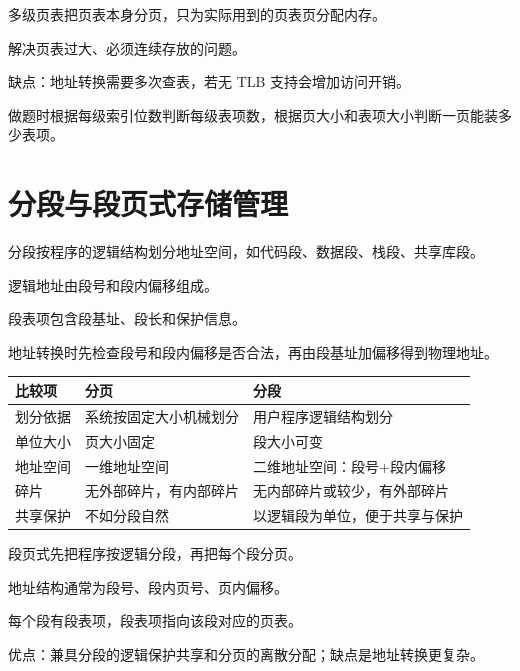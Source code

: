 \begin{points}
  \item 多级页表把页表本身分页，只为实际用到的页表页分配内存。
  \item 解决页表过大、必须连续存放的问题。
  \item 缺点：地址转换需要多次查表，若无 TLB 支持会增加访问开销。
  \item 做题时根据每级索引位数判断每级表项数，根据页大小和表项大小判断一页能装多少表项。
\end{points}


\section{分段与段页式存储管理}
\begin{points}
  \item 分段按程序的逻辑结构划分地址空间，如代码段、数据段、栈段、共享库段。
  \item 逻辑地址由段号和段内偏移组成。
  \item 段表项包含段基址、段长和保护信息。
  \item 地址转换时先检查段号和段内偏移是否合法，再由段基址加偏移得到物理地址。
\end{points}


\begin{longtable}{p{}p{}p{}}
\toprule
比较项 & 分页 & 分段 \\
\midrule
划分依据 & 系统按固定大小机械划分 & 用户程序逻辑结构划分 \\
单位大小 & 页大小固定 & 段大小可变 \\
地址空间 & 一维地址空间 & 二维地址空间：段号+段内偏移 \\
碎片 & 无外部碎片，有内部碎片 & 无内部碎片或较少，有外部碎片 \\
共享保护 & 不如分段自然 & 以逻辑段为单位，便于共享与保护 \\
\bottomrule
\end{longtable}

\begin{points}
  \item 段页式先把程序按逻辑分段，再把每个段分页。
  \item 地址结构通常为段号、段内页号、页内偏移。
  \item 每个段有段表项，段表项指向该段对应的页表。
  \item 优点：兼具分段的逻辑保护共享和分页的离散分配；缺点是地址转换更复杂。
\end{points}


